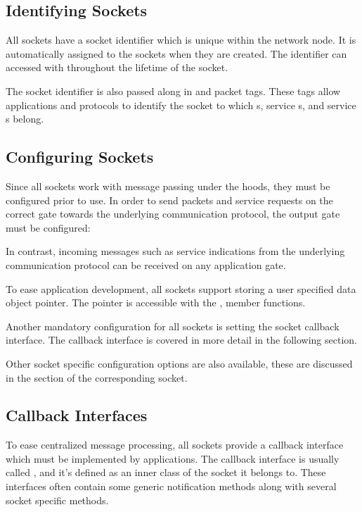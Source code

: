 \subsection*{Identifying Sockets}

All sockets have a socket identifier which is unique within the network node. It
is automatically assigned to the sockets when they are created. The identifier
can accessed with  throughout the lifetime of the socket.

The socket identifier is also passed along in  and
 packet tags. These tags allow applications and protocols to
identify the socket to which s, service s,
and service s belong.

\subsection*{Configuring Sockets}

Since all sockets work with message passing under the hoods, they must be
configured prior to use. In order to send packets and service requests on the
correct gate towards the underlying communication protocol, the output gate must
be configured:


In contrast, incoming messages such as service indications from the underlying
communication protocol can be received on any application gate.

To ease application development, all sockets support storing a user specified
data object pointer. The pointer is accessible with the ,
 member functions.

Another mandatory configuration for all sockets is setting the socket callback
interface. The callback interface is covered in more detail in the following
section.

Other socket specific configuration options are also available, these are
discussed in the section of the corresponding socket.

\subsection*{Callback Interfaces}

To ease centralized message processing, all sockets provide a callback interface
which must be implemented by applications. The callback interface is usually
called , and it's defined as an inner class of the socket it
belongs to. These interfaces often contain some generic notification methods
along with several socket specific methods.


